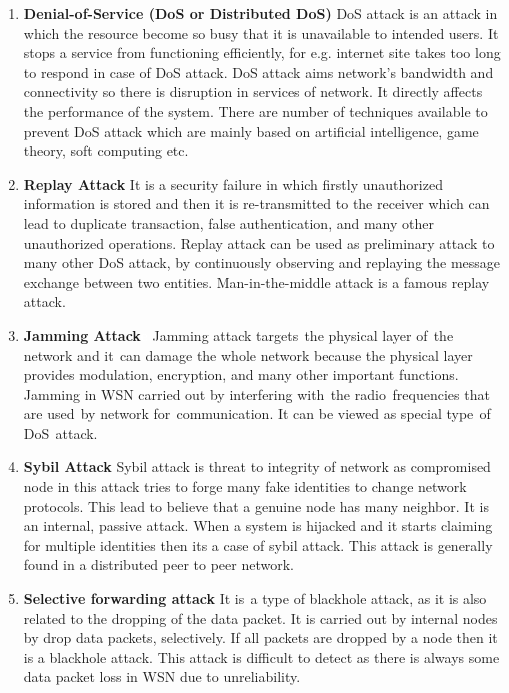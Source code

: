 \begin{enumerate}[label=\textbf{\roman*.}]
    \item \textbf{Denial-of-Service (DoS or Distributed DoS) }\cite{patil2016attack} DoS attack is an attack in which the resource become so busy that it is unavailable to intended users. It stops a service from functioning efficiently, for e.g. internet site takes too long to respond in case of DoS attack. DoS attack aims  network’s bandwidth and connectivity so there is disruption in services of network. It directly affects the performance of the system. There are number of techniques available to prevent DoS attack which are mainly based on artificial intelligence, game theory, soft computing etc.
    \item \textbf{Replay Attack }\cite{sharma2017mitigating}
    It is a security failure in which firstly unauthorized information is stored and then it is re-transmitted to the receiver which can lead to duplicate transaction, false authentication, and many other unauthorized operations. Replay attack can be used as preliminary attack to many other DoS attack, by continuously observing and replaying the message exchange between two entities. Man-in-the-middle attack is a famous replay attack.

    \item \textbf{Jamming Attack\textcolor{white}{e}}\cite{mpitziopoulos2009survey} Jamming attack targets\textcolor{white}{e}the physical layer of\textcolor{white}{e}the network and it\textcolor{white}{e}can damage the whole network because the physical layer provides modulation, encryption, and many other important functions. Jamming in WSN carried out by interfering with\textcolor{white}{e}the radio\textcolor{white}{e}frequencies that are used\textcolor{white}{e}by network for\textcolor{white}{e}communication. It can be viewed as special type\textcolor{white}{e}of DoS\textcolor{white}{e}attack.
    
    \item \textbf{Sybil Attack }\cite{ssu2009detecting} Sybil attack is threat to integrity of network as compromised node in this attack tries to forge many fake identities to change network protocols. This lead to believe that a genuine node has many neighbor. It is an internal, passive attack. When a system is hijacked and it starts claiming for multiple identities then its a case of sybil attack. This attack is generally found in a distributed peer to peer network. 
    
    \item \textbf{Selective forwarding attack }\cite{bysani2011survey} It is\textcolor{white}{e}a type of blackhole attack, as it is also related to the dropping of the data packet. It is carried out by internal nodes by drop data packets, selectively. If all packets are dropped by a node then it is a blackhole attack. This attack is difficult to detect as there is always some data packet loss in WSN due to unreliability.
    

\end{enumerate}
